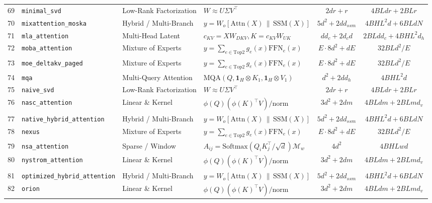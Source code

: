 \begin{center}
\begin{longtable}{rlllcc}
69 & \texttt{minimal\_svd} & Low-Rank Factorization & $W \approx U \Sigma V^\top$ & $2 d r + r$ & $4 B L d r + 2 B L r$ \\
70 & \texttt{mixattention\_moska} & Hybrid / Multi-Branch & $y = W_o [\text{Attn}(X) \,\|\, \text{SSM}(X)]$ & $5 d^2 + 2 d d_{ssm}$ & $4 B H L^2 d + 6 B L d N$ \\
71 & \texttt{mla\_attention} & Multi-Head Latent & $c_{KV} = X W_{DKV}, K = c_{KV} W_{UK}$ & $d d_c + 2 d_c d$ & $2 B L d d_c + 4 B H L^2 d_h$ \\
72 & \texttt{moba\_attention} & Mixture of Experts & $y = \sum_{e \in \text{Top2}} g_e(x) \text{FFN}_e(x)$ & $E \cdot 8 d^2 + d E$ & $32 B L d^2 / E$ \\
73 & \texttt{moe\_deltakv\_paged} & Mixture of Experts & $y = \sum_{e \in \text{Top2}} g_e(x) \text{FFN}_e(x)$ & $E \cdot 8 d^2 + d E$ & $32 B L d^2 / E$ \\
74 & \texttt{mqa} & Multi-Query Attention & $\text{MQA}(Q, \mathbf{1}_H \otimes K_1, \mathbf{1}_H \otimes V_1)$ & $d^2 + 2 d d_h$ & $4 B H L^2 d$ \\
75 & \texttt{naive\_svd} & Low-Rank Factorization & $W \approx U \Sigma V^\top$ & $2 d r + r$ & $4 B L d r + 2 B L r$ \\
76 & \texttt{nasc\_attention} & Linear \& Kernel & $\phi(Q)(\phi(K)^\top V) / \text{norm}$ & $3 d^2 + 2 d m$ & $4 B L d m + 2 B L m d_v$ \\
77 & \texttt{native\_hybrid\_attention} & Hybrid / Multi-Branch & $y = W_o [\text{Attn}(X) \,\|\, \text{SSM}(X)]$ & $5 d^2 + 2 d d_{ssm}$ & $4 B H L^2 d + 6 B L d N$ \\
78 & \texttt{nexus} & Mixture of Experts & $y = \sum_{e \in \text{Top2}} g_e(x) \text{FFN}_e(x)$ & $E \cdot 8 d^2 + d E$ & $32 B L d^2 / E$ \\
79 & \texttt{nsa\_attention} & Sparse / Window & $A_{ij} = \text{Softmax}(Q_i K_j^\top / \sqrt{d}) \mathcal{M}_w$ & $4 d^2$ & $4 B H L w d$ \\
80 & \texttt{nystrom\_attention} & Linear \& Kernel & $\phi(Q)(\phi(K)^\top V) / \text{norm}$ & $3 d^2 + 2 d m$ & $4 B L d m + 2 B L m d_v$ \\
81 & \texttt{optimized\_hybrid\_attention} & Hybrid / Multi-Branch & $y = W_o [\text{Attn}(X) \,\|\, \text{SSM}(X)]$ & $5 d^2 + 2 d d_{ssm}$ & $4 B H L^2 d + 6 B L d N$ \\
82 & \texttt{orion} & Linear \& Kernel & $\phi(Q)(\phi(K)^\top V) / \text{norm}$ & $3 d^2 + 2 d m$ & $4 B L d m + 2 B L m d_v$ \\

\end{longtable}
\end{center}

